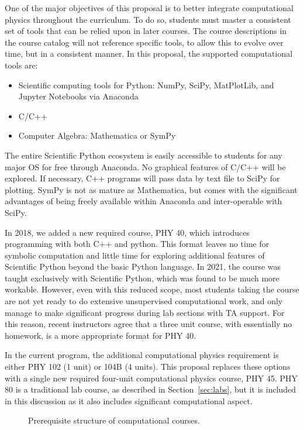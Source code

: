 \documentclass[12pt]{article}
\begin{document}
One of the major objectives of this proposal is to better integrate
computational physics throughout the curriculum.  To do so, students
must master a consistent set of tools that can be relied upon in later
courses.  The course descriptions in the course catalog will not
reference specific tools, to allow this to evolve over time, but in a
consistent manner.  In this proposal, the supported computational
tools are:
\begin{itemize}
\item Scientific computing tools for Python: NumPy, SciPy, MatPlotLib,
  and Jupyter Notebooks via Anaconda
\item C/C++
\item Computer Algebra:  Mathematica or SymPy
\end{itemize}
The entire Scientific Python ecosystem is easily accessible to
students for any major OS for free through Anaconda.  No graphical
features of C/C++ will be explored.  If necessary, C++ programs will
pass data by text file to SciPy for plotting.  SymPy is not as mature
as Mathematica, but comes with the significant advantages of being
freely available within Anaconda and inter-operable with SciPy.

In 2018, we added a new required course, PHY 40, which introduces
programming with both C++ and python.  This format leaves no time for
symbolic computation and little time for exploring additional features
of Scientific Python beyond the basic Python language.  In 2021, the
course was taught exclusively with Scientific Python, which was found
to be much more workable.  However, even with this reduced scope, most
students taking the course are not yet ready to do extensive
unsupervised computational work, and only manage to make significant
progress during lab sections with TA support.  For this reason, recent
instructors agree that a three unit course, with essentially no
homework, is a more appropriate format for PHY 40.

In the current program, the additional computational physics
requirement is either PHY 102 (1 unit) or 104B (4 units).  This
proposal replaces these options with a single new required four-unit
computational physics course, PHY 45.  PHY 80 is a traditional lab course, as described in
Section~\ref{sec:labs}, but it is included in this discussion as it
also includes significant computational aspect.

\begin{figure}
\begin{center}
\caption{\label{fig:comps} Prerequisite structure of computational courses.}
\end{center}
\end{figure}
\end{document}

